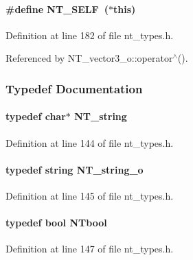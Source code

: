 \paragraph[{NT\_\-SELF}]{\setlength{\rightskip}{0pt plus 5cm}\#define NT\_\-SELF~($\ast$this)}\hfill\label{nt__types_8h_a26c322aabafa478d585a8ee0d26fd7b9}


Definition at line 182 of file nt\_\-types.h.



Referenced by NT\_\-vector3\_\-o::operator$^\wedge$().



\subsubsection{Typedef Documentation}
\paragraph[{NT\_\-string}]{\setlength{\rightskip}{0pt plus 5cm}typedef char$\ast$ {\bf NT\_\-string}}\hfill\label{nt__types_8h_a6ad3365da89b8087ee1b784feec0d896}


Definition at line 144 of file nt\_\-types.h.

\paragraph[{NT\_\-string\_\-o}]{\setlength{\rightskip}{0pt plus 5cm}typedef string {\bf NT\_\-string\_\-o}}\hfill\label{nt__types_8h_ae904a7013d8622f8e95e30d449f42283}


Definition at line 145 of file nt\_\-types.h.

\paragraph[{NTbool}]{\setlength{\rightskip}{0pt plus 5cm}typedef bool {\bf NTbool}}\hfill\label{nt__types_8h_a9f3200824a52174bb5be77bed3838822}


Definition at line 147 of file nt\_\-types.h.

